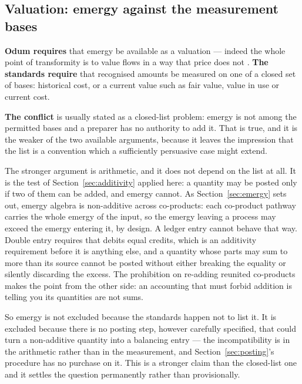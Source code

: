 \documentclass[11pt,a4paper]{article}
\begin{document}
\subsection{Valuation: emergy against the measurement bases}
\label{sec:valuation}

\textbf{Odum requires} that emergy be available as a valuation --- indeed the whole point of transformity is to value flows in a way that price does not \citep{odum1996,bastianoni2011}. \textbf{The standards require} that recognised amounts be measured on one of a closed set of bases: historical cost, or a current value such as fair value, value in use or current cost.

\textbf{The conflict} is usually stated as a closed-list problem: emergy is not among the permitted bases and a preparer has no authority to add it. That is true, and it is the weaker of the two available arguments, because it leaves the impression that the list is a convention which a sufficiently persuasive case might extend.

The stronger argument is arithmetic, and it does not depend on the list at all. It is the test of Section~\ref{sec:additivity} applied here: a quantity may be posted only if two of them can be added, and emergy cannot. As Section~\ref{sec:emergy} sets out, emergy algebra is non-additive across co-products: each co-product pathway carries the whole emergy of the input, so the emergy leaving a process may exceed the emergy entering it, by design. A ledger entry cannot behave that way. Double entry requires that debits equal credits, which is an additivity requirement before it is anything else, and a quantity whose parts may sum to more than its source cannot be posted without either breaking the equality or silently discarding the excess. The prohibition on re-adding reunited co-products makes the point from the other side: an accounting that must forbid addition is telling you its quantities are not sums.

So emergy is not excluded because the standards happen not to list it. It is excluded because there is no posting step, however carefully specified, that could turn a non-additive quantity into a balancing entry --- the incompatibility is in the arithmetic rather than in the measurement, and Section~\ref{sec:posting}'s procedure has no purchase on it. This is a stronger claim than the closed-list one and it settles the question permanently rather than provisionally.
\end{document}
